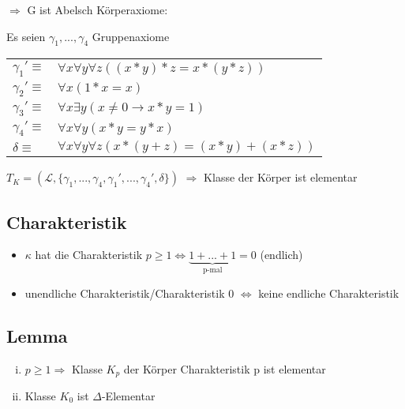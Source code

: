 \documentclass[12pt,a4paper]{article} %
\begin{document}
	$\Rightarrow$ G ist Abelsch \newline
	Körperaxiome:
	
	Es seien $\gamma_1, ..., \gamma_4$ Gruppenaxiome
	
	\begin{tabular}{l l}
		$\gamma_1' \equiv$ & $\forall x \forall y \forall z ((x * y) * z = x * (y * z))$ \\
		$\gamma_2' \equiv$ & $\forall x (1 * x = x)$ \\
		$\gamma_3' \equiv$ & $\forall x \exists y (x \ne 0 \rightarrow x * y = 1)$ \\
		$\gamma_4' \equiv$ & $\forall x \forall y (x * y = y * x)$ \\
		$\delta \equiv$ & $\forall x \forall y \forall z (x * (y + z) = (x * y) + (x * z))$
	\end{tabular}
	
	$T_K = (\mathcal{L}, \{\gamma_1, ..., \gamma_4, \gamma_1', ..., \gamma_4', \delta\})$\newline
	$\Rightarrow$ Klasse der Körper ist elementar
	
	\subsection{Charakteristik}
	\begin{itemize}
		\item $\kappa$ hat die Charakteristik $p \ge 1 \Leftrightarrow \underbrace{1 + ... + 1}_\text{p-mal} = 0$ (endlich)
		\item unendliche Charakteristik/Charakteristik 0 $\Leftrightarrow$ keine endliche Charakteristik
	\end{itemize}
	
	\subsection{Lemma}
	\begin{enumerate}[(i)]
		\item $p \ge 1 \Rightarrow$ Klasse $K_p$ der Körper Charakteristik p ist elementar
		\item Klasse $K_0$ ist $\Delta$-Elementar 
	\end{enumerate}
	
\end{document}
